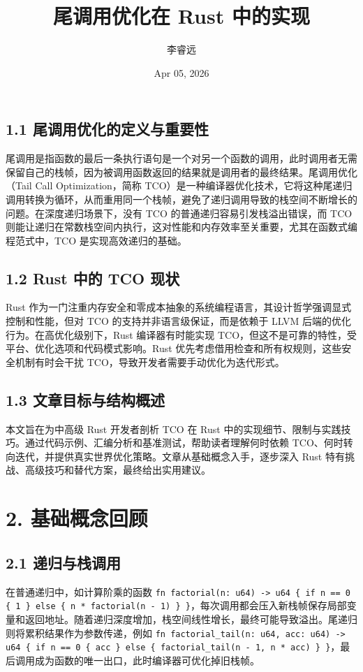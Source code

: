\title{尾调用优化在 Rust 中的实现}
\author{李睿远}
\date{Apr 05, 2026}
\maketitle
\section{1.1 尾调用优化的定义与重要性}
尾调用是指函数的最后一条执行语句是一个对另一个函数的调用，此时调用者无需保留自己的栈帧，因为被调用函数返回的结果就是调用者的最终结果。尾调用优化（Tail Call Optimization，简称 TCO）是一种编译器优化技术，它将这种尾递归调用转换为循环，从而重用同一个栈帧，避免了递归调用导致的栈空间不断增长的问题。在深度递归场景下，没有 TCO 的普通递归容易引发栈溢出错误，而 TCO 则能让递归在常数栈空间内执行，这对性能和内存效率至关重要，尤其在函数式编程范式中，TCO 是实现高效递归的基础。\par
\section{1.2 Rust 中的 TCO 现状}
Rust 作为一门注重内存安全和零成本抽象的系统编程语言，其设计哲学强调显式控制和性能，但对 TCO 的支持并非语言级保证，而是依赖于 LLVM 后端的优化行为。在高优化级别下，Rust 编译器有时能实现 TCO，但这不是可靠的特性，受平台、优化选项和代码模式影响。Rust 优先考虑借用检查和所有权规则，这些安全机制有时会干扰 TCO，导致开发者需要手动优化为迭代形式。\par
\section{1.3 文章目标与结构概述}
本文旨在为中高级 Rust 开发者剖析 TCO 在 Rust 中的实现细节、限制与实践技巧。通过代码示例、汇编分析和基准测试，帮助读者理解何时依赖 TCO、何时转向迭代，并提供真实世界优化策略。文章从基础概念入手，逐步深入 Rust 特有挑战、高级技巧和替代方案，最终给出实用建议。\par
\chapter{2. 基础概念回顾}
\section{2.1 递归与栈调用}
在普通递归中，如计算阶乘的函数 \texttt{fn factorial(n: u64) -> u64 \{{} if n == 0 \{{} 1 \}{} else \{{} n * factorial(n - 1) \}{} \}{}}，每次调用都会压入新栈帧保存局部变量和返回地址。随着递归深度增加，栈空间线性增长，最终可能导致溢出。尾递归则将累积结果作为参数传递，例如 \texttt{fn factorial\_{}tail(n: u64, acc: u64) -> u64 \{{} if n == 0 \{{} acc \}{} else \{{} factorial\_{}tail(n - 1, n * acc) \}{} \}{}}，最后调用成为函数的唯一出口，此时编译器可优化掉旧栈帧。\par
